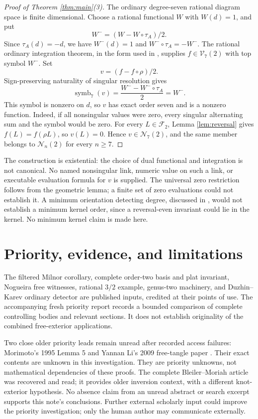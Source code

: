 \documentclass[11pt]{article}
\theoremstyle{remark}\newtheorem{remark}[theorem]{Remark}
\newcommand{\V}{\mathcal V}
\newcommand{\N}{\mathcal N}
\newcommand{\F}{\mathcal F}
\newcommand{\sig}{\operatorname{symb}}
\begin{document}
\begin{proof}[Proof of Theorem \ref{thm:main}(3)]
The ordinary degree-seven rational diagram space is finite dimensional.
Choose a rational functional $W$ with $W(d)=1$, and put
\[
W^-=(W-W\circ\tau_A)/2.
\]
Since $\tau_A(d)=-d$, we have $W^-(d)=1$ and
$W^-\circ\tau_A=-W^-$. The rational ordinary integration theorem, in the
form used in \cite[\S2 and \S6]{DKv5}, supplies $f\in\V_7(2)$ with top
symbol $W^-$. Set
\begin{equation}\label{eq:v}
v=(f-f\circ\rho)/2.
\end{equation}
Sign-preserving naturality of singular resolution gives
\[
\sig_7(v)=\frac{W^- -W^-\circ\tau_A}{2}=W^-.
\]
This symbol is nonzero on $d$, so $v$ has exact order seven and is a
nonzero function. Indeed, if all nonsingular values were zero, every
singular alternating sum and the symbol would be zero.
For every $L\in\F_2$, Lemma \ref{lem:reversal} gives
$f(L)=f(\rho L)$, so $v(L)=0$. Hence $v\in\N_7(2)$, and the same member
belongs to $\N_n(2)$ for every $n\geq7$.
\end{proof}
The construction is existential: the choice of dual functional and
integration is not canonical. No named nonsingular link, numeric value on
such a link, or executable evaluation formula for $v$ is supplied.
The universal zero restriction follows from the geometric lemma; a finite
set of zero evaluations could not establish it. A minimum orientation
detecting degree, discussed in \cite[Remark 1.4]{MY14}, would not establish
a minimum kernel order, since a reversal-even invariant could lie in the
kernel. No minimum kernel claim is made here.

\section{Priority, evidence, and limitations}
The filtered Milnor corollary, complete order-two basis and plat invariant,
Nogueira free witnesses, rational $3/2$ example, genus-two machinery, and
Duzhin--Karev ordinary detector are published inputs, credited at their
points of use. The accompanying fresh priority report records a bounded
comparison of complete controlling bodies and relevant sections. It does
not establish originality of the combined free-exterior applications.

Two close older priority leads remain unread after recorded access failures:
Morimoto's 1995 Lemma 5 \cite{Morimoto} and Yannan Li's 2009 free-tangle paper
\cite{Li}. Their exact contents are unknown in this investigation. They
are priority unknowns, not mathematical dependencies of these proofs.
The complete Bleiler--Moriah article was recovered and read; it provides
older inversion context, with a different knot-exterior hypothesis.
No absence claim from an unread abstract or search excerpt supports this
note's conclusions. Further external scholarly input could improve the
priority investigation; only the human author may communicate externally.
\end{document}
